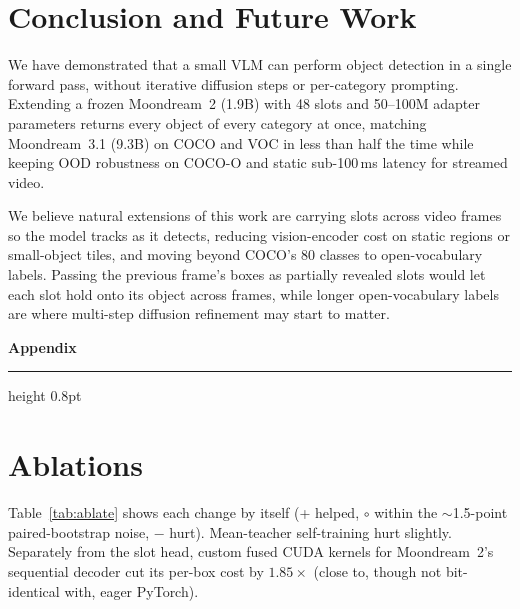 \documentclass[10pt,twocolumn]{article}
\newcommand{\ok}{\textcolor{green!45!black}{+}}
\newcommand{\no}{\textcolor{red!70!black}{$-$}}
\newcommand{\eq}{$\circ$}
\begin{document}
\section{Conclusion and Future Work}
We have demonstrated that a small VLM can perform object detection in a single forward
pass, without iterative diffusion steps or per-category prompting. Extending a frozen
Moondream~2 (1.9B) with 48 slots and 50--100M adapter parameters returns every object of
every category at once, matching Moondream~3.1 (9.3B) on COCO and VOC in less than half
the time while keeping OOD robustness on COCO-O and static sub-100\,ms latency for
streamed video.

We believe natural extensions of this work are carrying slots across video frames so the
model tracks as it detects, reducing vision-encoder cost on static regions or small-object
tiles, and moving beyond COCO's 80 classes to open-vocabulary labels. Passing the
previous frame's boxes as partially revealed slots would let each slot hold onto its
object across frames, while longer open-vocabulary labels are where multi-step diffusion
refinement may start to matter.



\clearpage
\onecolumn
\appendix
{\raggedright
{\Large\sffamily\bfseries Appendix\par}
\vspace{0.4em}
{\color{cardborder}\hrule height 0.8pt}
}
\vspace{0.8em}

\section{Ablations}
Table~\ref{tab:ablate} shows each change by itself (\ok{} helped, \eq{} within the
$\sim$1.5-point paired-bootstrap noise, \no{} hurt). Mean-teacher self-training hurt slightly. Separately from the slot head, custom fused CUDA kernels for Moondream~2's
sequential decoder cut its per-box cost by $1.85\times$ (close to, though not
bit-identical with, eager PyTorch).
\end{document}
